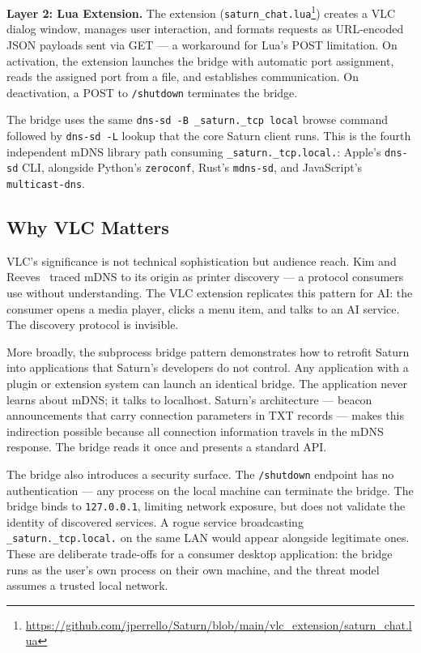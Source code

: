 \textbf{Layer 2: Lua Extension.} The extension (\texttt{saturn\_chat.lua}\footnote{\url{https://github.com/jperrello/Saturn/blob/main/vlc_extension/saturn_chat.lua}}) creates a VLC dialog window, manages user interaction, and formats requests as URL-encoded JSON payloads sent via GET --- a workaround for Lua's POST limitation. On activation, the extension launches the bridge with automatic port assignment, reads the assigned port from a file, and establishes communication. On deactivation, a POST to \texttt{/shutdown} terminates the bridge.

The bridge uses the same \texttt{dns-sd -B \_saturn.\_tcp local} browse command followed by \texttt{dns-sd -L} lookup that the core Saturn client runs. This is the fourth independent mDNS library path consuming \texttt{\_saturn.\_tcp.local.}: Apple's \texttt{dns-sd} CLI, alongside Python's \texttt{zeroconf}, Rust's \texttt{mdns-sd}, and JavaScript's \texttt{multicast-dns}.

\subsection{Why VLC Matters}

VLC's significance is not technical sophistication but audience reach. Kim and Reeves~\cite{kim2020dns} traced mDNS to its origin as printer discovery --- a protocol consumers use without understanding. The VLC extension replicates this pattern for AI: the consumer opens a media player, clicks a menu item, and talks to an AI service. The discovery protocol is invisible.

More broadly, the subprocess bridge pattern demonstrates how to retrofit Saturn into applications that Saturn's developers do not control. Any application with a plugin or extension system can launch an identical bridge. The application never learns about mDNS; it talks to localhost. Saturn's architecture --- beacon announcements that carry connection parameters in TXT records --- makes this indirection possible because all connection information travels in the mDNS response. The bridge reads it once and presents a standard API.

The bridge also introduces a security surface. The \texttt{/shutdown} endpoint has no authentication --- any process on the local machine can terminate the bridge. The bridge binds to \texttt{127.0.0.1}, limiting network exposure, but does not validate the identity of discovered services. A rogue service broadcasting \texttt{\_saturn.\_tcp.local.} on the same LAN would appear alongside legitimate ones. These are deliberate trade-offs for a consumer desktop application: the bridge runs as the user's own process on their own machine, and the threat model assumes a trusted local network.

